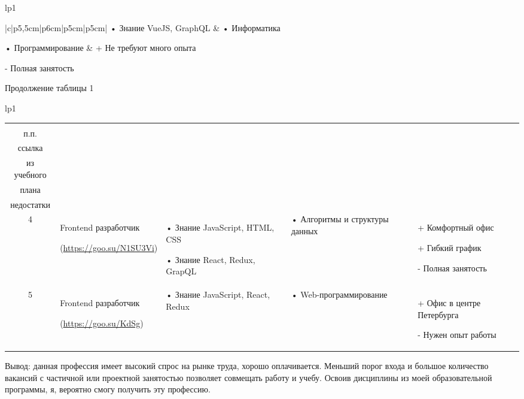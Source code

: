 \documentclass[14pt]{extreport}
\begin{document}
\begin{landscape}
\begin{longtable}[H]{lp{1\linewidth}}
\begin{small}
\begin{tabular}{|c|p{}|p{6cm}|p{5cm}|p{5cm}|}
•	Знание VueJS, GraphQL
&
•	Информатика

•	Программирование
&
+	Не требуют много опыта

-	Полная занятость
\\
	\hline


    \end{tabular}
\end{small}
\end{longtable}

\addtocounter{table}{-1}
\newpage
Продолжение таблицы 1
\begin{longtable}[H]{lp{1\linewidth}}
\caption{Продолжение таблицы 1}



\centering
\begin{small}


    \begin{tabular}{|c|p{}|p{6cm}|p{5cm}|p{5cm}|}
	\hline 
	\makecell{№ \\ п.п.} &	\makecell{Название должности,\\ ссылка} &	\makecell{Требования} & 	\makecell{Дисциплины \\ из учебного \\плана} &	\makecell{Преимущества и \\недостатки}  \\ 
	\hline 
4 & Frontend разработчик

(\url{https://goo.su/N1SU3Vi}) 
 & •	Знание JavaScript, HTML, CSS 

•	Знание React, Redux, GrapQL &
•	Алгоритмы и структуры данных &
+	Комфортный офис

+	Гибкий график

-	Полная занятость\\
\hline
5 & Frontend разработчик 

(\url{https://goo.su/KdSg}) & •	Знание JavaScript, React, Redux & •	Web-программирование & 
+	Офис в центре Петербурга

-	Нужен опыт работы\\

	\hline

    \end{tabular}
    \end{small}
\end{longtable}

Вывод: данная профессия имеет высокий спрос на рынке труда, хорошо оплачивается. Меньший порог входа и большое количество вакансий с частичной или проектной занятостью позволяет совмещать работу и учебу. Освоив дисциплины из моей образовательной программы, я, вероятно смогу получить эту профессию.





\end{landscape}
\end{document}
